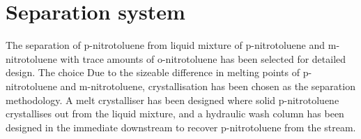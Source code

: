 \section*{Separation system}

The separation of p-nitrotoluene from liquid mixture of p-nitrotoluene and m-nitrotoluene with trace amounts of o-nitrotoluene has been selected for detailed design. The choice  Due to the sizeable difference in melting points of p-nitrotoluene and m-nitrotoluene, crystallisation has been chosen as the separation methodology. A melt crystalliser has been designed where solid p-nitrotoluene crystallises out from the liquid mixture, and a hydraulic wash column has been designed in the immediate downstream to recover p-nitrotoluene from the stream. 